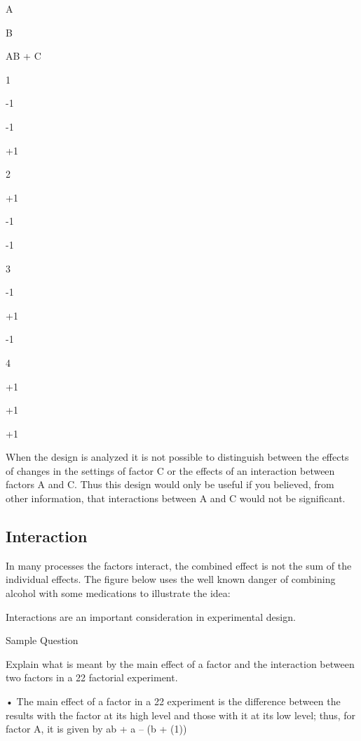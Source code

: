 \documentclass[]{article}
\begin{document}
A
 

B
 

AB + C
 



1
 

-1
 

-1
 

+1
 



2
 

+1
 

-1
 

-1
 



3
 

-1
 

+1
 

-1
 



4
 

+1
 

+1
 

+1
 

When the design is analyzed it is not possible to distinguish between the effects of changes in the settings of factor C or the effects of an interaction between factors A and C. Thus this design would only be useful if you believed, from other information, that interactions between A and C would not be significant.


\subsection{Interaction}

In many processes the factors interact, the combined effect is not the sum of the individual effects. The figure below uses the well known danger of combining alcohol with some medications to illustrate the idea:









 


Interactions are an important consideration in experimental design.


Sample Question


Explain what is meant by the main effect of a factor and the interaction between two factors in a 22 factorial experiment.

•
The main effect of a factor in a 22 experiment is the difference between the results with the factor at its high level and those with it at its low level; thus, for factor A, it is given by ab + a – (b + (1)) 
\end{document}
